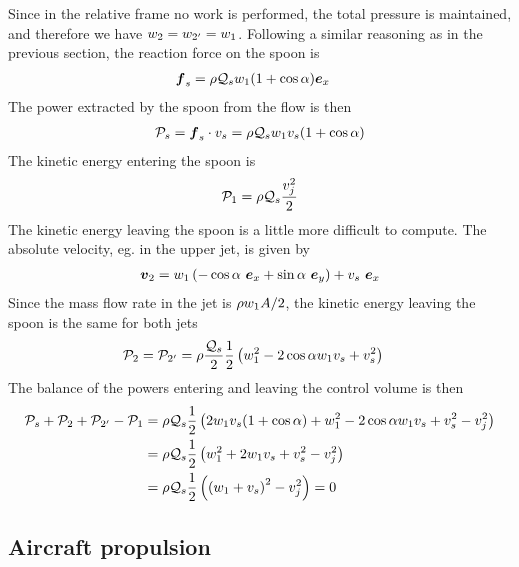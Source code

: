 Since in the relative frame no work is performed, the total pressure
is maintained, and therefore we have $w_{2} = w_{2'} =
w_1$. Following a similar reasoning as in the previous section,
the reaction force on the spoon is
\begin{align*}
  \boldsymbol {f}_s &= \rho \mathcal Q_s w_1 (1 + \cos{\alpha}) \boldsymbol e_{x}
\end{align*}
The power extracted by the spoon from the flow is then
\begin{align*}
  \mathcal P_s = \boldsymbol {f}_s \cdot v_s = \rho \mathcal Q_s w_1 v_s (1 +
  \cos{\alpha})
\end{align*}
The kinetic energy entering the spoon is 
\begin{align*}
  \mathcal P_{1} = \rho \mathcal Q_s \frac{v_j^2}{2}
\end{align*}
The kinetic energy leaving the spoon is a little more difficult to
compute. The absolute velocity, eg. in the upper jet, is given by
\begin{align*}
  \boldsymbol {v}_{2} = w_1 \left(- \cos{\alpha}~\boldsymbol e_{x} +
    \sin{\alpha}~\boldsymbol e_{y}\right) + v_s ~ \boldsymbol e_{x}
\end{align*}
Since the mass flow rate in the jet is $\rho w_1 A/2$, the kinetic
energy leaving the spoon is the same for both jets
\begin{align*}
  \mathcal P_{2} = \mathcal P_{2'} &= \rho \frac{\mathcal Q_s}{2} \frac{1}{2}
  \left(w_1^2 - 2 \cos{\alpha} w_1 v_s + v_s^2\right)
\end{align*}
The balance of the powers entering and leaving the control volume is
then
\begin{align*}
  \mathcal P_s + \mathcal P_{2} + \mathcal P_{2'} - \mathcal P_1 &= \rho \mathcal Q_s
  \frac{1}{2}
  \left(2 w_1 v_s (1 + \cos{\alpha}) + w_1^2 - 2 \cos{\alpha} w_1 v_s + v_s^2 - v_j^2\right)\\
  &= \rho \mathcal Q_s \frac{1}{2} \left(w_1^2 + 2 w_1 v_s + v_s^2 - v_j^2\right)\\
  &= \rho \mathcal Q_s \frac{1}{2} \left(\left(w_1 + v_s\right)^2 - v_j^2\right) = 0
\end{align*}

\subsection*{Aircraft propulsion}

